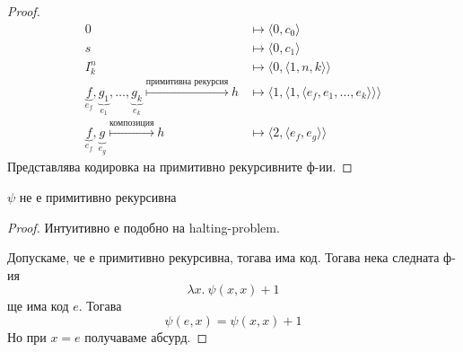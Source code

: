 \begin{proof}
    \begin{equation*}
        \begin{split}
            0 & \mapsto \langle 0, c_0\rangle \\
            s & \mapsto \langle 0, c_1\rangle \\
            I_k^n &\mapsto \langle 0, \langle 1, n, k\rangle\rangle \\
            \underbrace{f}_{e_f}, \underbrace{g_1}_{e_1}, \dots, \underbrace{g_k}_{e_k} \overset{\text{примитивна рекурсия}}{\mapsto} h &\mapsto \langle 1, \langle1, \langle e_f, e_1, \dots, e_k\rangle\rangle\rangle \\
            \underbrace{f}_{e_f}, \underbrace{g}_{e_g} \overset{\text{композиция}}{\mapsto} h &\mapsto \langle 2, \langle e_f, e_g\rangle\rangle
        \end{split}
    \end{equation*}
    Представлява кодировка на примитивно рекурсивните ф-ии.
\end{proof}
\begin{proposition}
    $\psi$ не е примитивно рекурсивна
\end{proposition}
\begin{proof}
    Интуитивно е подобно на halting-problem.

    Допускаме, че е примитивно рекурсивна, тогава има код. Тогава нека следната ф-ия
    \begin{equation*}
        \lambda x.\ \psi(x, x) + 1
    \end{equation*}
    ще има код $e$. Тогава
    \begin{equation*}
        \psi(e, x) = \psi(x, x) + 1
    \end{equation*}
    Но при $x = e$ получаваме абсурд.
\end{proof}

